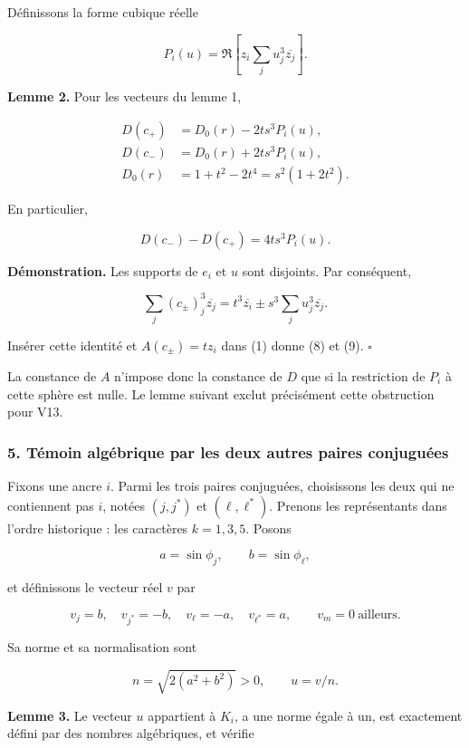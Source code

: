 \documentclass[
  10pt,
  a4paper,
]{article}
\begin{document}
Définissons la forme cubique réelle

\[
P_i(u)=\Re\!\left[z_i\sum_j u_j^3\overline{z_j}\right]. \tag{7}
\]

\textbf{Lemme 2.} Pour les vecteurs du lemme 1,

\[
\begin{aligned}
D(c_+)&=D_0(r)-2ts^3P_i(u),\\
D(c_-)&=D_0(r)+2ts^3P_i(u),\\
D_0(r)&=1+t^2-2t^4=s^2(1+2t^2).
\end{aligned} \tag{8}
\]

En particulier,

\[
D(c_-)-D(c_+)=4ts^3P_i(u). \tag{9}
\]

\textbf{Démonstration.} Les supports de \(e_i\) et \(u\) sont disjoints.
Par conséquent,

\[
\sum_j(c_\pm)_j^3\overline{z_j}
=t^3\overline{z_i}\pm s^3\sum_j u_j^3\overline{z_j}.
\]

Insérer cette identité et \(A(c_\pm)=tz_i\) dans (1) donne (8) et (9).
\(\square\)

La constance de \(A\) n'impose donc la constance de \(D\) que si la
restriction de \(P_i\) à cette sphère est nulle. Le lemme suivant exclut
précisément cette obstruction pour V13.

\hypertarget{tuxe9moin-alguxe9brique-par-les-deux-autres-paires-conjuguuxe9es}{%
\subsubsection{5. Témoin algébrique par les deux autres paires
conjuguées}\label{tuxe9moin-alguxe9brique-par-les-deux-autres-paires-conjuguuxe9es}}

Fixons une ancre \(i\). Parmi les trois paires conjuguées, choisissons
les deux qui ne contiennent pas \(i\), notées \((j,j^*)\) et
\((\ell,\ell^*)\). Prenons les représentants dans l'ordre historique :
les caractères \(k=1,3,5\). Posons

\[
a=\sin\phi_j,\qquad b=\sin\phi_\ell,
\]

et définissons le vecteur réel \(v\) par

\[
v_j=b,\quad v_{j^*}=-b,\quad
v_\ell=-a,\quad v_{\ell^*}=a,
\qquad v_m=0\ \text{ailleurs}. \tag{10}
\]

Sa norme et sa normalisation sont

\[
n=\sqrt{2(a^2+b^2)}>0,\qquad u=v/n. \tag{11}
\]

\textbf{Lemme 3.} Le vecteur \(u\) appartient à \(K_i\), a une norme
égale à un, est exactement défini par des nombres algébriques, et
vérifie
\end{document}
